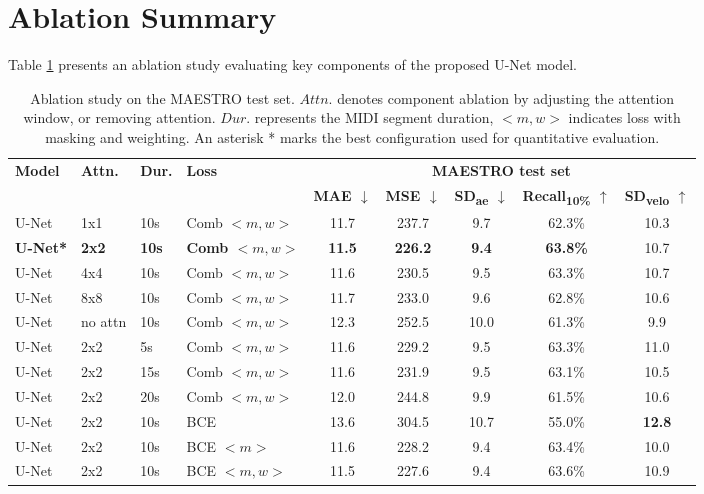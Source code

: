 \section{Ablation Summary}
Table \ref{tb:result_maestro} presents an ablation study evaluating key components of the proposed U-Net model.

\begin{table}[h!]
\centering
\caption{Ablation study on the MAESTRO test set. \(Attn.\) denotes component ablation by adjusting the attention window, or removing attention. \(Dur.\) represents the MIDI segment duration, $<m,w>$ indicates loss with masking and weighting. An asterisk * marks the best configuration used for quantitative evaluation.}
\label{tb:result_maestro}
\setlength{\tabcolsep}{1.5pt}          %
\fontsize{11pt}{12pt}\selectfont     %
\renewcommand{\arraystretch}{1.2}    %
\begin{tabular}{llll|ccccc}
\toprule
\multirow{2}{*}{\textbf{Model}} &
\multirow{2}{*}{\textbf{Attn.}} &
\multirow{2}{*}{\textbf{Dur.}} &
\multirow{2}{*}{\textbf{Loss}} &
\multicolumn{5}{c}{\textbf{MAESTRO test set}} \\
\cmidrule(l){5-9}
& & & &
\textbf{MAE \(\downarrow\)} &
\textbf{MSE \(\downarrow\)} &
\textbf{SD\textsubscript{ae} \(\downarrow\)} &
\textbf{Recall\textsubscript{10\%} \(\uparrow\)} &
\textbf{SD\textsubscript{velo} \(\uparrow\)} \\
\midrule
U-Net & 1x1     & 10s & Comb $<m,w>$ & 11.7 & 237.7 & 9.7 & 62.3\% & 10.3\\
\textbf{U-Net*} & \textbf{2x2} & \textbf{10s} & \textbf{Comb $<m,w>$} & \textbf{11.5} & \textbf{226.2} & \textbf{9.4} & \textbf{63.8\%} & 10.7\\
U-Net & 4x4     & 10s & Comb $<m,w>$ & 11.6 & 230.5 & 9.5 & 63.3\% & 10.7\\
U-Net & 8x8     & 10s & Comb $<m,w>$ & 11.7 & 233.0 & 9.6 & 62.8\% & 10.6\\
U-Net & no attn & 10s & Comb $<m,w>$ & 12.3 & 252.5 & 10.0 & 61.3\% & 9.9\\
\midrule
U-Net & 2x2     & 5s  & Comb $<m,w>$ & 11.6 & 229.2 & 9.5 & 63.3\% & 11.0\\
U-Net & 2x2     & 15s & Comb $<m,w>$ & 11.6 & 231.9 & 9.5 & 63.1\% & 10.5\\
U-Net & 2x2     & 20s & Comb $<m,w>$ & 12.0 & 244.8 & 9.9 & 61.5\% & 10.6\\
\midrule
U-Net & 2x2     & 10s & BCE          & 13.6 & 304.5 & 10.7 & 55.0\% & \textbf{12.8} \\
U-Net & 2x2     & 10s & BCE $<m>$    & 11.6 & 228.2 & 9.4 & 63.4\% & 10.0 \\
U-Net & 2x2     & 10s & BCE $<m,w>$  & 11.5 & 227.6 & 9.4 & 63.6\% & 10.9 \\
\bottomrule
\end{tabular}
\end{table}


